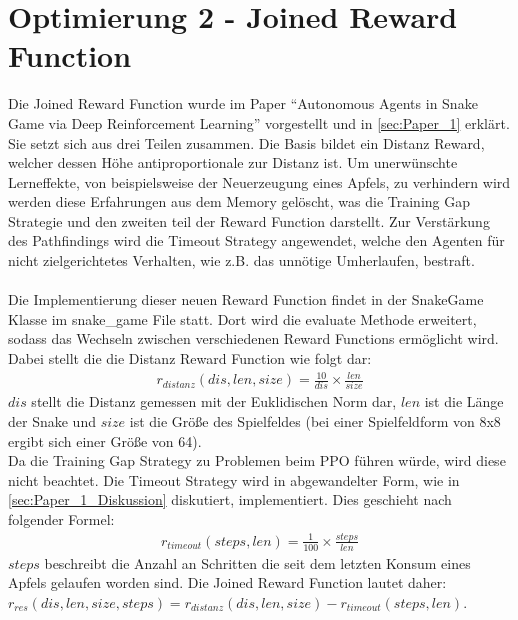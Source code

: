\section{Optimierung 2 - Joined Reward Function}
Die Joined Reward Function wurde im Paper "`Autonomous Agents in Snake Game via Deep Reinforcement Learning"' vorgestellt und in \ref{sec:Paper_1} erklärt. Sie setzt sich aus drei Teilen zusammen. Die Basis bildet ein Distanz Reward, welcher dessen Höhe antiproportionale zur Distanz ist. Um unerwünschte Lerneffekte, von beispielsweise der Neuerzeugung eines Apfels, zu verhindern wird werden diese Erfahrungen aus dem Memory gelöscht, was die Training Gap Strategie und den zweiten teil der Reward Function darstellt. Zur Verstärkung des Pathfindings wird die Timeout Strategy angewendet, welche den Agenten für nicht zielgerichtetes Verhalten, wie z.B. das unnötige Umherlaufen, bestraft.\\
\\ Die Implementierung dieser neuen Reward Function findet in der SnakeGame Klasse im snake\_game File statt. Dort wird die evaluate Methode erweitert, sodass das Wechseln zwischen verschiedenen Reward Functions ermöglicht wird. Dabei stellt die die Distanz Reward Function wie folgt dar:
\begin{align}
	r_{distanz}(dis, len, size) = \frac{10}{dis} \times \frac{len}{size}
\end{align}
$dis$ stellt die Distanz gemessen mit der Euklidischen Norm dar, $len$ ist die Länge der Snake und $size$ ist die Größe des Spielfeldes (bei einer Spielfeldform von 8x8 ergibt sich einer Größe von 64).\\ Da die Training Gap Strategy zu Problemen beim PPO führen würde, wird diese nicht beachtet. Die Timeout Strategy wird in abgewandelter Form, wie in \ref{sec:Paper_1_Diskussion} diskutiert, implementiert. Dies geschieht nach folgender Formel:
\begin{align}
	r_{timeout}(steps, len) = \frac{1}{100} \times \frac{steps}{len}
\end{align}
$steps$ beschreibt die Anzahl an Schritten die seit dem letzten Konsum eines Apfels gelaufen worden sind. 
Die Joined Reward Function lautet daher: $r_{res}(dis, len, size, steps) = 	r_{distanz}(dis, len, size) - r_{timeout}(steps, len)$.

